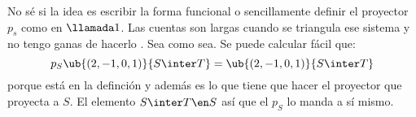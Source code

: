 \begin{enumerate}[label=\alph*)]
        No sé si la idea es escribir la forma funcional o sencillamente definir el proyector $p_s$ como en
        $\llamada1$. Las cuentas son largas cuando se triangula ese sistema y no tengo ganas de hacerlo \grimace. Sea como sea.
        Se puede calcular fácil que:
        $$
          p_S\ub{(2,-1,0,1)}{S\inter T} = \ub{(2,-1,0,1)}{S\inter T}
        $$
        porque está en la definción y además es lo que tiene que hacer el proyector que proyecta a $S$.
        El elemento $S \inter T \en S$ así que el $p_S$ lo manda a sí mismo.
\end{enumerate}

\begin{aportes}
  \item {}
\end{aportes}
